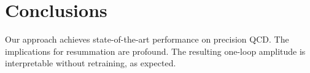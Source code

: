 \section{Conclusions}\label{sec:conclusions}

Our approach achieves state-of-the-art performance on precision QCD. The
implications for resummation are profound. The resulting one-loop
amplitude is interpretable without retraining, as expected.

